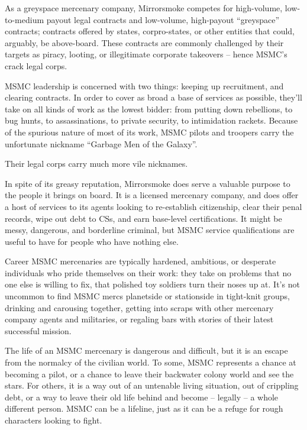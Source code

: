 As a greyspace mercenary company, Mirrorsmoke competes for high-volume, low-to-medium
payout legal contracts and low-volume, high-payout “greyspace” contracts; contracts offered by
states, corpro-states, or other entities that could, arguably, be above-board. These contracts are
commonly challenged by their targets as piracy, looting, or illegitimate corporate takeovers --
hence MSMC’s crack legal corps.


MSMC leadership is concerned with two things: keeping up recruitment, and clearing contracts.
In order to cover as broad a base of services as possible, they’ll take on all kinds of work as the
lowest bidder: from putting down rebellions, to bug hunts, to assassinations, to private security,
to intimidation rackets. Because of the spurious nature of most of its work, MSMC pilots and
troopers carry the unfortunate nickname “Garbage Men of the Galaxy”.


Their legal corps carry much more vile nicknames.


In spite of its greasy reputation, Mirrorsmoke does serve a valuable purpose to the people it
brings on board. It is a licensed mercenary company, and does offer a host of services to its
agents looking to re-establish citizenship, clear their penal records, wipe out debt to CSs, and
earn base-level certifications. It might be messy, dangerous, and borderline criminal, but MSMC
service qualifications are useful to have for people who have nothing else.


Career MSMC mercenaries are typically hardened, ambitious, or desperate individuals who pride
themselves on their work: they take on problems that no one else is willing to fix, that polished
toy soldiers turn their noses up at. It’s not uncommon to find MSMC mercs planetside or
stationside in tight-knit groups, drinking and carousing together, getting into scraps with other
mercenary company agents and militaries, or regaling bars with stories of their latest successful
mission.


The life of an MSMC mercenary is dangerous and difficult, but it is an escape from the normalcy
of the civilian world. To some, MSMC represents a chance at becoming a pilot, or a chance to
leave their backwater colony world and see the stars. For others, it is a way out of an untenable
living situation, out of crippling debt, or a way to leave their old life behind and become -- legally
-- a whole different person. MSMC can be a lifeline, just as it can be a refuge for rough
characters looking to fight.





